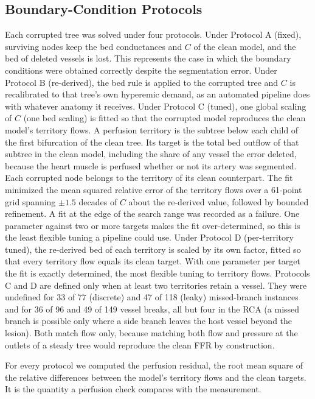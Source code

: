 \documentclass[journal]{IEEEtran}
\begin{document}
\subsection{Boundary-Condition Protocols}
Each corrupted tree was solved under four protocols. Under Protocol A (fixed), surviving
nodes keep the bed conductances and $C$ of the clean model, and the bed of deleted vessels is lost. This represents
the case in which the boundary conditions were obtained correctly despite the segmentation error. Under Protocol B
(re-derived), the bed rule is applied to the corrupted tree and $C$ is recalibrated to that tree's own hyperemic
demand, as an automated pipeline does with whatever anatomy it receives. Under Protocol C (tuned), one global
scaling of $C$ (one bed scaling) is fitted so that the corrupted model reproduces the clean model's territory
flows. A perfusion territory is the subtree below each child of
the first bifurcation of the clean tree. Its target is the total bed outflow of that subtree in the clean model,
including the share of any vessel the error deleted, because the heart muscle is perfused whether or not its artery
was segmented. Each corrupted node belongs to the territory of its clean counterpart. The fit minimized the mean
squared relative error of the territory flows over a 61-point grid spanning $\pm 1.5$ decades of $C$ about the
re-derived value, followed by bounded refinement. A fit at the edge of the search range was recorded as a failure.
One parameter against two or more targets makes the fit over-determined, so this is the least flexible tuning a
pipeline could use. Under Protocol D (per-territory tuned), the re-derived bed of each territory is scaled by its
own factor, fitted so that every territory flow equals its clean target. With one parameter per target the fit is
exactly determined, the most flexible tuning to territory flows. Protocols C and D are defined only when at least two territories retain a vessel. They were undefined for 33 of
77 (discrete) and 47 of 118 (leaky) missed-branch instances and for 36 of 96 and 49 of 149 vessel breaks, all but
four in the RCA (a missed branch is possible only where a side branch leaves the host vessel beyond the lesion). Both match
flow only, because matching both flow and pressure at the outlets of a steady tree would reproduce the clean FFR by
construction.

For every protocol we computed the perfusion residual, the root mean square of the relative differences between the
model's territory flows and the clean targets. It is the quantity a perfusion check compares with the measurement.
\end{document}
